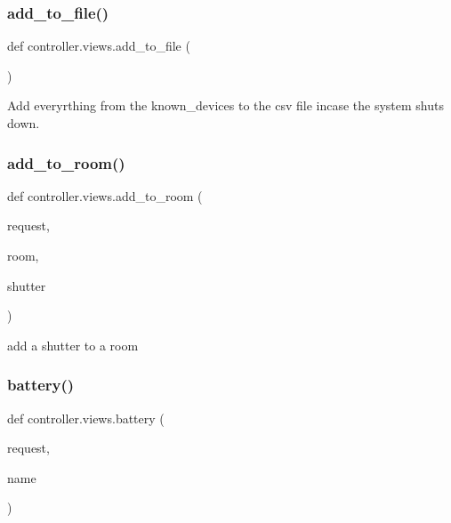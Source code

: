 \subsubsection{\texorpdfstring{add\+\_\+to\+\_\+file()}{add\_to\_file()}}
{\footnotesize\ttfamily def controller.\+views.\+add\+\_\+to\+\_\+file (\begin{DoxyParamCaption}{ }\end{DoxyParamCaption})}



Add everyrthing from the known\+\_\+devices to the csv file incase the system shuts down. 

\mbox{\label{namespacecontroller_1_1views_a4e7163f7f3a8bb5c7600ffd72e0fa6d1}} 
\subsubsection{\texorpdfstring{add\+\_\+to\+\_\+room()}{add\_to\_room()}}
{\footnotesize\ttfamily def controller.\+views.\+add\+\_\+to\+\_\+room (\begin{DoxyParamCaption}\item[{}]{request,  }\item[{}]{room,  }\item[{}]{shutter }\end{DoxyParamCaption})}



add a shutter to a room 

\mbox{\label{namespacecontroller_1_1views_a81a56f3af5249f251206b7c898f5e99c}} 
\subsubsection{\texorpdfstring{battery()}{battery()}}
{\footnotesize\ttfamily def controller.\+views.\+battery (\begin{DoxyParamCaption}\item[{}]{request,  }\item[{}]{name }\end{DoxyParamCaption})}



